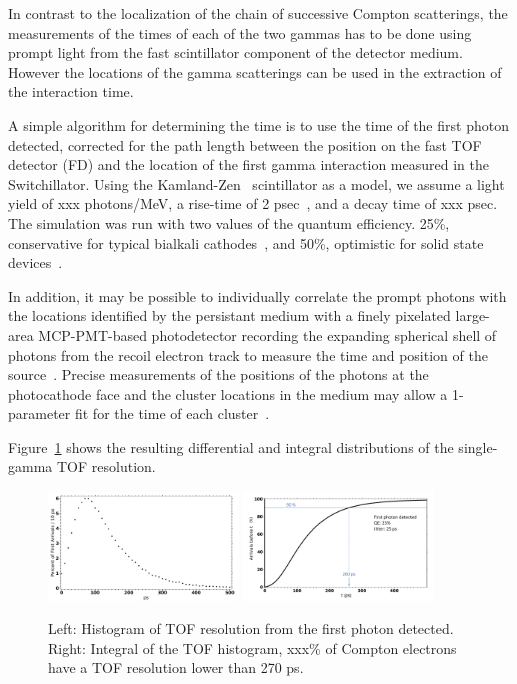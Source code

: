 \documentclass[12pt]{article}
\begin{document}
In contrast to the localization of the chain of successive Compton scatterings, the measurements of the times of each of the two gammas has to be done using prompt light from the fast scintillator component of the detector medium. However the locations of the gamma scatterings can be used in the extraction of the interaction time.

A simple algorithm for determining the time is to use the time of the first photon detected, corrected for the path length between the position on the fast TOF detector (FD) and the location of the first gamma interaction measured in the Switchillator. Using the Kamland-Zen~\cite{Kamland_Zen} scintillator as a model, we assume  a light yield of xxx photons/MeV, a rise-time of 2 psec~\cite{Buck_private_comm}, and a decay time of xxx psec. The simulation was run with two values of the quantum efficiency. 25\%, conservative for typical bialkali cathodes~\cite{Incom_production}, and 50\%, optimistic for solid state devices~\cite{Hamamatsu_mppc_modules_kacc9019e}.

In addition, it may be possible to individually correlate the prompt photons with the locations identified by the persistant medium with a finely pixelated large-area MCP-PMT-based
photodetector recording the expanding spherical shell
of photons from the recoil electron track to measure the time and position of the
source~\cite{RISC}. Precise measurements of the positions of the photons at the photocathode face and the cluster locations in the medium may allow a 1-parameter fit for the time of each cluster~\cite{One_parameter_fit}.

Figure~\ref{fig:TOF_differential_integral} shows the resulting differential and integral distributions of the single-gamma TOF resolution.

\begin{figure}[!ht]
\centering
\includegraphics[angle=0,width=0.45\textwidth]{Figures/joao_tof_v1a.png}
\hfil
\includegraphics[angle=0,width=0.45\textwidth]{Figures/joao_TOFIntegralPlotV2a.png}
\caption{ Left: Histogram of TOF resolution from the first photon detected. Right: Integral of the TOF histogram, xxx\% of Compton electrons have a TOF resolution lower than 270 ps.}

\label{fig:TOF_differential_integral}
\end{figure}
\end{document}
